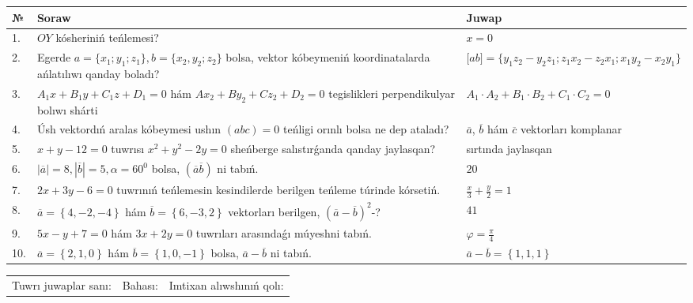 \documentclass{article}
\begin{document}
\begin{tabular}{|m{0.7cm}|m{10cm}|m{4cm}|}
\hline
№ & Soraw & Juwap \\
\hline
1. & $OY$ kósheriniń teńlemesi? & $x=0$ \\
\hline
2. & Egerde $a=\{ x_1; y_1; z_1\}, b=\{ x_2, y_2; z_2\}$ bolsa, vektor kóbeymeniń koordinatalarda ańlatılıwı qanday boladı? &  $\lbrack ab\rbrack=\{y_1z_2-y_2z_1; z_1x_2-z_2x_1; x_1y_2-x_2y_1\}$ \\
\hline
3. & $A_1x+B_1y+C_1z+D_1=0$ hám $Ax_2+By_2+Cz_2+D_2=0$ tegislikleri perpendikulyar bolıwı shárti & $A_1\cdot A_2+B_1\cdot B_2+C_1\cdot C_2=0$ \\
\hline
4. & Úsh vektordıń aralas kóbeymesi ushın $(abc)=0$ teńligi orınlı bolsa ne dep ataladı? & $\overline{a}$, $\overline{b}$ hám $\overline{c}$ vektorları komplanar \\
\hline
5. & $x+y-12=0$ tuwrısı $x^{2}+y^{2}-2y=0$ sheńberge salıstırǵanda qanday jaylasqan? & sırtında jaylasqan \\
\hline
6. & $\left| \overline{a} \right|=8, \left| \overline{b} \right|=5, \alpha=60^{0}$ bolsa, $( \overline{a}\overline{b} )$ ni tabıń. & $20$ \\
\hline
7. & $2x+3y-6=0$ tuwrınıń teńlemesin kesindilerde berilgen teńleme túrinde kórsetiń. & $\frac{x}{3} + \frac{ y }{ 2 } =  1$ \\
\hline
8. & $\overline{a}=\left\{ 4,-2,-4 \right\}$ hám $\overline{b}=\left\{ 6,-3, 2 \right\}$ vektorları berilgen, $(\overline{a}-\overline{b}) ^{2}$-? & $41$ \\
\hline
9. & $5x-y+7=0$ hám $3x+2y=0$ tuwrıları arasındaǵı múyeshni tabıń. & $\varphi=\frac{\pi}{4}$ \\
\hline
10. & $\overline{a}=\left\{ 2, 1, 0 \right\}$ hám $\overline{b}=\left\{ 1, 0,-1 \right\}$ bolsa, $\overline{a}-\overline{b}$ ni tabıń. & $\overline{a} -\overline{b} = \left\{ 1,1,1 \right\}$ \\
\hline
\end{tabular}

\vspace{1cm}

\begin{tabular}{lll}
Tuwrı juwaplar sanı: \underline{\hspace{1.5cm}} & 
Bahası: \underline{\hspace{1.5cm}} & 
Imtixan alıwshınıń qolı: \underline{\hspace{2cm}} \\
\end{tabular}
\end{document}
